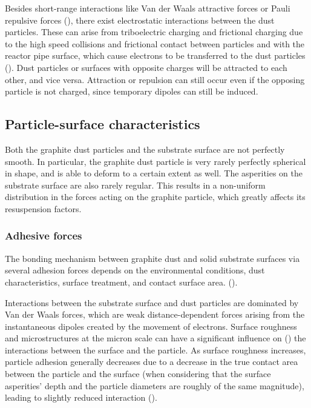 \documentclass{article}
\begin{document}
Besides short-range interactions like Van der Waals attractive forces or Pauli repulsive forces (\cite{henry2018}), there exist electrostatic interactions between the dust particles. These can arise from triboelectric charging and frictional charging due to the high speed collisions and frictional contact between particles and with the reactor pipe surface, which cause electrons to be transferred to the dust particles (\cite{SHEN2023118880}). Dust particles or surfaces with opposite charges will be attracted to each other, and vice versa. Attraction or repulsion can still occur even if the opposing particle is not charged, since temporary dipoles can still be induced. 


\subsection{Particle-surface characteristics}

Both the graphite dust particles and the substrate surface are not perfectly smooth. In particular, the graphite dust particle is very rarely perfectly spherical in shape, and is able to deform to a certain extent as well. The asperities on the substrate surface are also rarely regular. This results in a non-uniform distribution in the forces acting on the graphite particle, which greatly affects its resuspension factors. 

\subsubsection{Adhesive forces}
The bonding mechanism between graphite dust and solid substrate surfaces via several adhesion forces depends on the environmental conditions, dust characteristics, surface treatment, and contact surface area. (\cite{ISAIFAN2019413}). 

Interactions between the substrate surface and dust particles are dominated by Van der Waals forces, which are weak distance-dependent forces arising from the instantaneous dipoles created by the movement of electrons. Surface roughness and microstructures at the micron scale can have a significant influence on (\cite{ZHANG2023118877}) the interactions between the surface and the particle. As surface roughness increases, particle adhesion generally decreases due to a decrease in the true contact area between the particle and the surface (when considering that the surface asperities' depth and the particle diameters are roughly of the same magnitude), leading to slightly reduced interaction (\cite{KATAINEN2006524}). 
\end{document}

